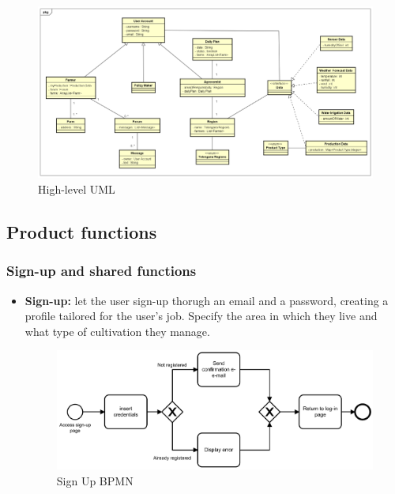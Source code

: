 \documentclass[table, 12pt]{article}
\begin{document}
\begin{center}
    \begin{figure}[!h]
        \includegraphics[scale=0.45, center]{assets/UML/UML.png}
        \caption{High-level UML}
        \label{fig: UML}
    \end{figure}
\end{center}
\newpage
\subsection{Product functions}
\label{product_functions}
\subsubsection{Sign-up and shared functions}
\begin{itemize}
    \item \textbf{Sign-up:} let the user sign-up thorugh an email and a password, creating a profile tailored for the user's job. Specify the area in which they live and what type of cultivation they manage.
    \begin{center}
        \begin{figure}[!h]
            \includegraphics[width=\textwidth]{assets/BPMN/SignUpBpmn}
            \caption{Sign Up BPMN}
            \label{fig: singup}
        \end{figure}
    \end{center}
\end{itemize}
\end{document}
